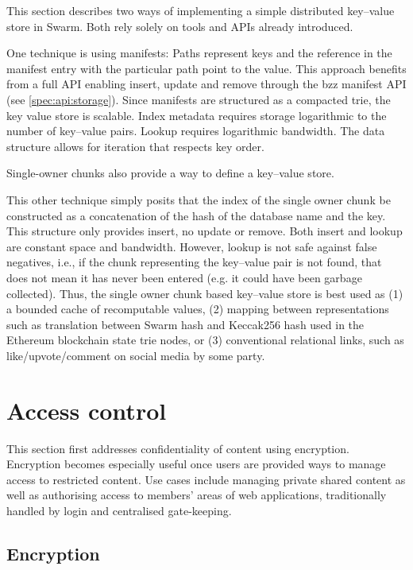 This section describes two ways of implementing a simple distributed key--value store in Swarm. Both rely solely on tools and APIs already introduced.

One technique is using manifests: Paths represent keys and the reference in the manifest entry with the particular path point to the value. This approach benefits from a full API enabling insert, update and remove through the bzz manifest API (see \ref{spec:api:storage}). Since manifests are structured as a compacted trie, the key value store is scalable. Index metadata requires storage logarithmic to the number of key--value pairs. Lookup requires logarithmic bandwidth. The data structure allows for iteration that respects key order. 

Single-owner chunks also provide a way to define a key--value store.

This other technique simply posits that the index of the single owner chunk be constructed as a concatenation of the hash of the database name and the key. This structure only provides insert, no update or remove. Both insert and lookup are constant space and bandwidth. However, lookup is not safe against false negatives, i.e., if the chunk representing the key--value pair is not found, that does not mean it has never been entered (e.g. it could have been garbage collected). Thus, the single owner chunk based key--value store is best used as (1) a bounded cache of recomputable values, (2) mapping between representations such as translation between Swarm hash and Keccak256 hash used in the Ethereum blockchain state trie nodes, or (3) conventional relational links, such as like/upvote/comment on social media by some party. 


\section{Access control}\label{sec:access-control}

\green{}

This section first addresses confidentiality of content using encryption. Encryption becomes especially useful once users are provided ways to manage access to restricted content. Use cases include managing private shared content as well as authorising access to members' areas of web applications, traditionally handled by login and centralised gate-keeping.

\subsection{Encryption}\label{sec:encryption}

